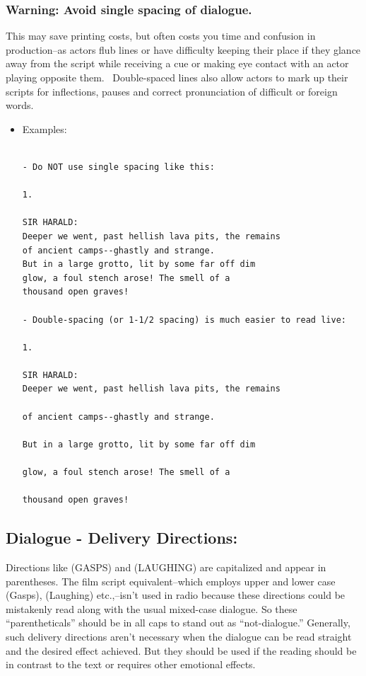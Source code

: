 \documentclass[openleft,oneside,showtrims]{memoir}
\begin{document}
\subsubsection*{Warning: Avoid single spacing of dialogue.}
\label{sec:org6c96ae1}

This may save printing costs, but often costs you time and confusion in production--as actors flub lines or have difficulty keeping their place if they glance away from the script while receiving a cue or making eye contact with an actor playing opposite them.  Double-spaced lines also allow actors to mark up their scripts for inflections, pauses and correct pronunciation of difficult or foreign words.

\begin{itemize}
\item Examples:  
\label{sec:orgb2253f2}

\lstset{language=fountain,label= ,caption= ,captionpos=b,numbers=none}
\begin{lstlisting}

- Do NOT use single spacing like this:

1.

SIR HARALD:
Deeper we went, past hellish lava pits, the remains 
of ancient camps--ghastly and strange.
But in a large grotto, lit by some far off dim
glow, a foul stench arose! The smell of a
thousand open graves!

- Double-spacing (or 1-1/2 spacing) is much easier to read live:

1.

SIR HARALD:
Deeper we went, past hellish lava pits, the remains 
  
of ancient camps--ghastly and strange.
  
But in a large grotto, lit by some far off dim
  
glow, a foul stench arose! The smell of a
  
thousand open graves!

\end{lstlisting}
\end{itemize}

\subsection{Dialogue - Delivery Directions:}
\label{sec:orga88a277}
Directions like (GASPS) and (LAUGHING) are capitalized and appear in parentheses. The film script equivalent--which employs upper and lower case (Gasps), (Laughing) etc.,--isn't used in radio because these directions could be mistakenly read along with the usual mixed-case dialogue. So these ``parentheticals'' should be in all caps to stand out as ``not-dialogue.'' Generally, such delivery directions aren't necessary when the dialogue can be read straight and the desired effect achieved. But they should be used if the reading should be in contrast to the text or requires other emotional effects.
\end{document}
